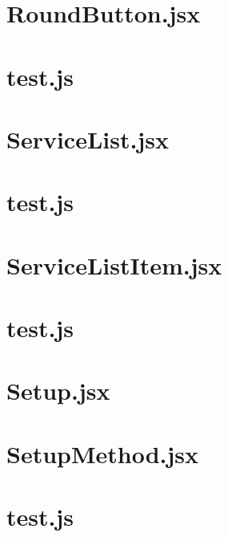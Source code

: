 \documentclass[a4paper,landscape]{report}
\begin{document}
\newpage
\section{RoundButton.jsx}


\newpage
\section{test.js}


\newpage
\section{ServiceList.jsx}


\newpage
\section{test.js}


\newpage
\section{ServiceListItem.jsx}


\newpage
\section{test.js}


\newpage
\section{Setup.jsx}


\newpage
\section{SetupMethod.jsx}


\newpage
\section{test.js}

\end{document}
